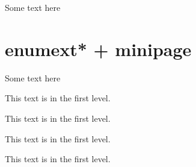 \documentclass{article}
\begin{document}
Some text here

\section{enumext* + minipage}

Some text here

\begin{enumext*}[columns=2,labelwidth=1cm,labelsep=0.25cm,align=left,partopsep=0.5cm,mini-env=0.4\linewidth, mini-right = {This text is in minipage.}]
  \item This text is in the first level.
  \item This text is in the first level.
  \item This text is in the first level.
  \item This text is in the first level.
\end{enumext*}
\end{document}
